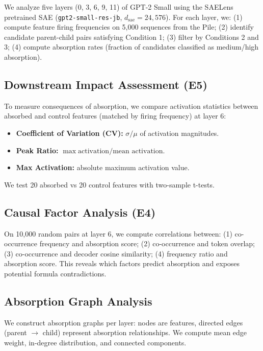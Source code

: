 \documentclass{article}
\begin{document}
We analyze five layers (0, 3, 6, 9, 11) of GPT-2 Small using the SAELens pretrained SAE (\texttt{gpt2-small-res-jb}, $d_{\text{sae}}=24{,}576$). For each layer, we: (1) compute feature firing frequencies on 5,000 sequences from the Pile; (2) identify candidate parent-child pairs satisfying Condition 1; (3) filter by Conditions 2 and 3; (4) compute absorption rates (fraction of candidates classified as medium/high absorption).

\subsection{Downstream Impact Assessment (E5)}
\label{subsec:e5}

To measure consequences of absorption, we compare activation statistics between absorbed and control features (matched by firing frequency) at layer 6:
\begin{itemize}
    \item \textbf{Coefficient of Variation (CV):} $\sigma / \mu$ of activation magnitudes.
    \item \textbf{Peak Ratio:} $\max \text{activation} / \text{mean activation}$.
    \item \textbf{Max Activation:} absolute maximum activation value.
\end{itemize}
We test 20 absorbed vs 20 control features with two-sample t-tests.

\subsection{Causal Factor Analysis (E4)}
\label{subsec:e4}

On 10,000 random pairs at layer 6, we compute correlations between: (1) co-occurrence frequency and absorption score; (2) co-occurrence and token overlap; (3) co-occurrence and decoder cosine similarity; (4) frequency ratio and absorption score. This reveals which factors predict absorption and exposes potential formula contradictions.

\subsection{Absorption Graph Analysis}
\label{subsec:graph}

We construct absorption graphs per layer: nodes are features, directed edges (parent $\rightarrow$ child) represent absorption relationships. We compute mean edge weight, in-degree distribution, and connected components.
\end{document}
